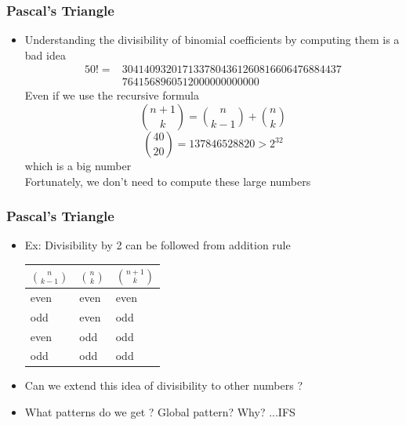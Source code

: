 \documentclass{beamer}
\begin{document}
\begin{frame}
    \frametitle{Pascal's Triangle}
    \begin{itemize}
        \item
        Understanding the divisibility of binomial coefficients by computing them is a bad idea
        \begin{align*}
            50! = &3041409320171337804361260816606476884437\\
            &7641568960512000000000000   
        \end{align*}
        Even if we use the recursive formula 
        \begin{equation*}
            \binom{n+1}{k}= \binom{n}{k-1} + \binom{n}{k}
        \end{equation*}
        \begin{equation*}
            \binom{40}{20} = 137846528820 > 2^{32}
        \end{equation*}
        which is a big number\\
        Fortunately, we don't need to compute these large numbers
        \end{itemize}
    
\end{frame}

\begin{frame}
    \frametitle{Pascal's Triangle}
    \begin{itemize}
        \item
        Ex: Divisibility by 2 can be followed from addition rule 
        \begin{table}[H]
            \begin{tabular}{|l|l|l|}
                \hline
                $\binom{n}{k-1}$& $\binom{n}{k}$& $\binom{n+1}{k}$\\
                \hline
                even & even & even \\
                odd  & even & odd  \\
                even & odd  & odd  \\
                odd  & odd  & odd\\
                \hline
            \end{tabular}
        \end{table}
        \item
        Can we extend this idea of divisibility to other numbers ?
        \item
        What patterns do we get ? Global pattern? Why? ...IFS
    \end{itemize}
\end{frame}
\end{document}

